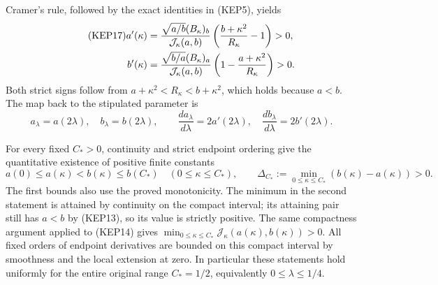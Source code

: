 Cramer's rule, followed by the exact identities in (KEP5), yields
\begin{align}\tag{KEP17}
 a'(\kappa)&=
 \frac{\sqrt{a/b}(B_\kappa)_b}{\mathcal J_\kappa(a,b)}
       \left(\frac{b+\kappa^2}{R_\kappa}-1\right)>0,\\
 b'(\kappa)&=
 \frac{\sqrt{b/a}(B_\kappa)_a}{\mathcal J_\kappa(a,b)}
       \left(1-\frac{a+\kappa^2}{R_\kappa}\right)>0.\notag
\end{align}
Both strict signs follow from
$a+\kappa^2<R_\kappa<b+\kappa^2$, which holds because $a<b$.
The map back to the stipulated parameter is
\begin{equation}\tag{KEP18}
 a_\lambda=a(2\lambda),\quad b_\lambda=b(2\lambda),\qquad
 \frac{da_\lambda}{d\lambda}=2a'(2\lambda),\quad
 \frac{db_\lambda}{d\lambda}=2b'(2\lambda).
\end{equation}

For every fixed $C_*>0$, continuity and strict endpoint ordering give
the quantitative existence of positive finite constants
\begin{equation}\tag{KEP19}
 a(0)\leq a(\kappa)<b(\kappa)\leq b(C_*)\quad(0\leq \kappa\leq C_*),
 \qquad
 \Delta_{C_*}:=\min_{0\leq \kappa\leq C_*}(b(\kappa)-a(\kappa))>0.
\end{equation}
The first bounds also use the proved monotonicity. The minimum in the
second statement is attained by continuity on the compact interval;
its attaining pair still has $a<b$ by (KEP13), so its value is
strictly positive. The same compactness argument applied to (KEP14)
gives
$\min_{0\leq \kappa\leq C_*}\mathcal J_\kappa(a(\kappa),b(\kappa))>0$.
All fixed orders of endpoint derivatives are bounded on this compact
interval by smoothness and the local extension at zero.
In particular these statements hold uniformly for the entire original
range $C_*=1/2$, equivalently $0\leq\lambda\leq1/4$.

